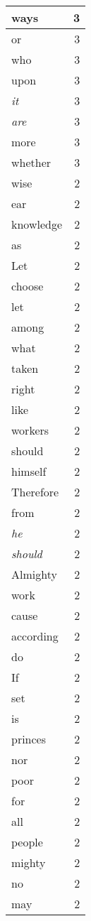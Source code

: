 \begin{center}
\begin{longtable}{l|r}
ways & 3 \\ \hline
or & 3 \\ \hline
who & 3 \\ \hline
upon & 3 \\ \hline
\emph{it} & 3 \\ \hline
\emph{are} & 3 \\ \hline
more & 3 \\ \hline
whether & 3 \\ \hline
wise & 2 \\ \hline
ear & 2 \\ \hline
knowledge & 2 \\ \hline
as & 2 \\ \hline
Let & 2 \\ \hline
choose & 2 \\ \hline
let & 2 \\ \hline
among & 2 \\ \hline
what & 2 \\ \hline
taken & 2 \\ \hline
right & 2 \\ \hline
like & 2 \\ \hline
workers & 2 \\ \hline
should & 2 \\ \hline
himself & 2 \\ \hline
Therefore & 2 \\ \hline
from & 2 \\ \hline
\emph{he} & 2 \\ \hline
\emph{should} & 2 \\ \hline
Almighty & 2 \\ \hline
work & 2 \\ \hline
cause & 2 \\ \hline
according & 2 \\ \hline
do & 2 \\ \hline
If & 2 \\ \hline
set & 2 \\ \hline
is & 2 \\ \hline
princes & 2 \\ \hline
nor & 2 \\ \hline
poor & 2 \\ \hline
for & 2 \\ \hline
all & 2 \\ \hline
people & 2 \\ \hline
mighty & 2 \\ \hline
no & 2 \\ \hline
may & 2 \\ \hline

\end{longtable}
\end{center}
